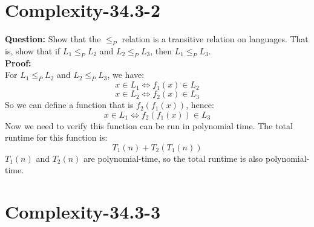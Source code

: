 \documentclass[12pt]{article}
\begin{document}
\section{Complexity-34.3-2}
\textbf{Question:} Show that the \(\leq_P\) relation is a transitive relation on languages. That is, show that if \(L_1 \leq_PL_2 \) and \(L_2\leq_P L_3\), then \(L_1\leq_P L_3\). \\
\textbf{Proof:}\\
For \(L_1 \leq_PL_2 \) and \(L_2\leq_P L_3\), we have:
\[x \in L_1 \iff f_1(x) \in L_2\]
\[x \in L_2 \iff f_2(x) \in L_3\]
So we can define a function that is \(f_2(f_1(x))\), hence:
\[x \in L_1 \iff f_2(f_1(x)) \in L_3\]
Now we need to verify this function can be run in polynomial time.
The total runtime for this function is:
\[T_1(n)+T_2(T_1(n))\]
\(T_1(n)\) and \(T_2(n)\) are polynomial-time, so the total runtime is also polynomial-time.






\section{Complexity-34.3-3}
\end{document}

